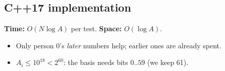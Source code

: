 
\subsection*{C++17 implementation}

\begin{complexitybox}
\textbf{Time:} $O(N\log A)$ per test. \textbf{Space:} $O(\log A)$.
\end{complexitybox}

\begin{pitfallbox}
\begin{itemize}
  \item Only person $0$'s \emph{later} numbers help; earlier ones are already
        spent.
  \item $A_i\le10^{18}<2^{60}$: the basis needs bits $0..59$ (we keep 61).
\end{itemize}
\end{pitfallbox}
